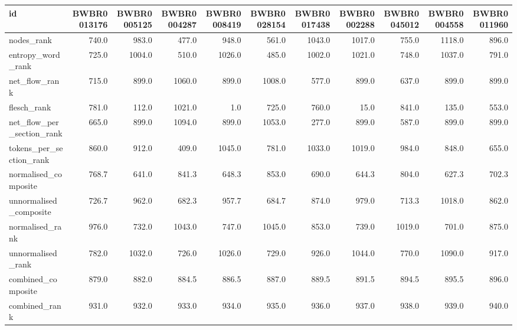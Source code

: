 \begin{tabular}{lrrrrrrrrrr}
\toprule
id & BWBR0013176 & BWBR0005125 & BWBR0004287 & BWBR0008419 & BWBR0028154 & BWBR0017438 & BWBR0002288 & BWBR0045012 & BWBR0004558 & BWBR0011960 \\
\midrule
nodes\_rank & 740.0 & 983.0 & 477.0 & 948.0 & 561.0 & 1043.0 & 1017.0 & 755.0 & 1118.0 & 896.0 \\
\cline{1-11}
entropy\_word\_rank & 725.0 & 1004.0 & 510.0 & 1026.0 & 485.0 & 1002.0 & 1021.0 & 748.0 & 1037.0 & 791.0 \\
\cline{1-11}
net\_flow\_rank & 715.0 & 899.0 & 1060.0 & 899.0 & 1008.0 & 577.0 & 899.0 & 637.0 & 899.0 & 899.0 \\
\cline{1-11}
flesch\_rank & 781.0 & 112.0 & 1021.0 & 1.0 & 725.0 & 760.0 & 15.0 & 841.0 & 135.0 & 553.0 \\
\cline{1-11}
net\_flow\_per\_section\_rank & 665.0 & 899.0 & 1094.0 & 899.0 & 1053.0 & 277.0 & 899.0 & 587.0 & 899.0 & 899.0 \\
\cline{1-11}
tokens\_per\_section\_rank & 860.0 & 912.0 & 409.0 & 1045.0 & 781.0 & 1033.0 & 1019.0 & 984.0 & 848.0 & 655.0 \\
\cline{1-11}
normalised\_composite & 768.7 & 641.0 & 841.3 & 648.3 & 853.0 & 690.0 & 644.3 & 804.0 & 627.3 & 702.3 \\
\cline{1-11}
unnormalised\_composite & 726.7 & 962.0 & 682.3 & 957.7 & 684.7 & 874.0 & 979.0 & 713.3 & 1018.0 & 862.0 \\
\cline{1-11}
normalised\_rank & 976.0 & 732.0 & 1043.0 & 747.0 & 1045.0 & 853.0 & 739.0 & 1019.0 & 701.0 & 875.0 \\
\cline{1-11}
unnormalised\_rank & 782.0 & 1032.0 & 726.0 & 1026.0 & 729.0 & 926.0 & 1044.0 & 770.0 & 1090.0 & 917.0 \\
\cline{1-11}
combined\_composite & 879.0 & 882.0 & 884.5 & 886.5 & 887.0 & 889.5 & 891.5 & 894.5 & 895.5 & 896.0 \\
\cline{1-11}
combined\_rank & 931.0 & 932.0 & 933.0 & 934.0 & 935.0 & 936.0 & 937.0 & 938.0 & 939.0 & 940.0 \\
\cline{1-11}
\bottomrule
\end{tabular}

